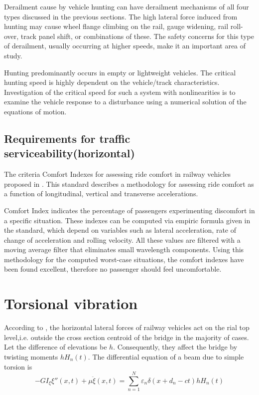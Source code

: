 Derailment cause by vehicle hunting can have derailment mechanisms of all four types discussed in the previous sections. The high lateral force induced from hunting may cause wheel flange climbing on the rail, gauge widening, rail roll-over, track panel shift, or combinations of these. The safety concerns for this type of derailment, usually occurring at higher speeds, make it an important area of study.

Hunting predominantly occurs in empty or lightweight vehicles. The critical hunting speed is highly dependent on the vehicle/track characteristics. Investigation of the critical speed for such a system with nonlinearities is to examine the vehicle response to a disturbance using a numerical solution of the equations of motion.

\subsection{Requirements for traffic serviceability(horizontal)}

The criteria Comfort Indexes for assessing ride comfort in railway vehicles proposed in \cite{12299}. This standard describes a methodology for assessing ride comfort as a function of longitudinal, vertical and transverse accelerations.

Comfort Index indicates the percentage of passengers experimenting discomfort in a specific situation. These indexes can be computed via empiric formula given in the standard, which depend on variables such as lateral acceleration, rate of change of acceleration and rolling velocity. All these values are filtered with a moving average filter that eliminates small wavelength components. Using this methodology for the computed worst-case situations, the comfort indexes have been found excellent, therefore no passenger should feel uncomfortable. 

\section{Torsional vibration}
According to \cite[9.1.3]{fryba1996dynamics}, the horizontal lateral forces of railway vehicles act on the rial top level,i.e. outside the cross section centroid of the bridge in the majority of cases. Let the difference of elevations be $ h $. Consequently, they affect the bridge by twisting moments $ hH_n(t) $. The differential equation of a beam due to simple torsion is 
\begin{equation}
	-GI_\xi \xi''(x,t)+\mu \ddot{\xi}(x,t)=\sum_{n=1}^{N}\varepsilon_n \delta (x+d_n-ct)h H_n(t)
\end{equation}

